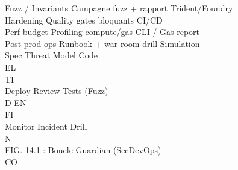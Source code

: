 Fuzz / Invariants Campagne fuzz + rapport           Trident/Foundry\\
Hardening         Quality gates bloquants           CI/CD\\
Perf budget       Profiling compute/gas             CLI / Gas report\\
Post-prod ops     Runbook + war-room drill          Simulation\\
\vspace{0.5em}
\vspace{0.5em}
\vspace{0.5em}
Spec             Threat Model              Code\\
\vspace{0.5em}
\vspace{0.5em}
\vspace{0.5em}
\vspace{0.5em}
EL\\
TI\\
Deploy             Review             Tests (Fuzz)\\
\vspace{0.5em}
\vspace{0.5em}
\vspace{0.5em}
\vspace{0.5em}
D    EN\\
FI\\
Monitor             Incident Drill\\
\vspace{0.5em}
\vspace{0.5em}
N\\
FIG. 14.1 : Boucle Guardian (SecDevOps)\\
CO\\
\vspace{0.5em}
